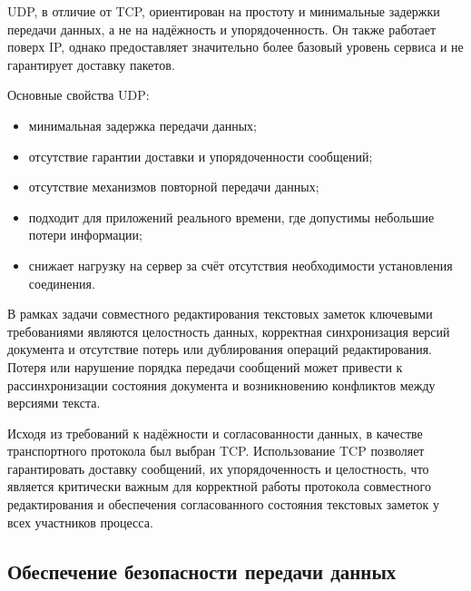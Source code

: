 UDP, в отличие от TCP, ориентирован на простоту и минимальные задержки передачи данных, а не на надёжность и упорядоченность. Он также работает поверх IP, однако предоставляет значительно более базовый уровень сервиса и не гарантирует доставку пакетов.

Основные свойства UDP:

\begin{itemize}
    \item минимальная задержка передачи данных;
    \item отсутствие гарантии доставки и упорядоченности сообщений;
    \item отсутствие механизмов повторной передачи данных;
    \item подходит для приложений реального времени, где допустимы небольшие потери информации;
    \item снижает нагрузку на сервер за счёт отсутствия необходимости установления соединения.
\end{itemize}

В рамках задачи совместного редактирования текстовых заметок ключевыми требованиями являются целостность данных, корректная синхронизация версий документа и отсутствие потерь или дублирования операций редактирования. Потеря или нарушение порядка передачи сообщений может привести к рассинхронизации состояния документа и возникновению конфликтов между версиями текста.

Исходя из требований к надёжности и согласованности данных, в качестве транспортного протокола был выбран TCP. Использование TCP позволяет гарантировать доставку сообщений, их упорядоченность и целостность, что является критически важным для корректной работы протокола совместного редактирования и обеспечения согласованного состояния текстовых заметок у всех участников процесса.

\subsection*{Обеспечение безопасности передачи данных}



